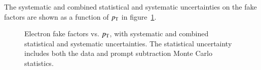 The systematic and combined statistical and systematic uncertainties on the fake factors are shown as a function of $p_{\text{T}}$ in figure~\ref{fig:electron-fake-factor-uncertainties}.

\begin{figure}[htbp] 
  \centering
  \caption{Electron fake factors vs. $p_{\text{T}}$, with systematic and combined statistical and systematic uncertainties. The statistical uncertainty includes both the data and prompt subtraction Monte Carlo statistics.}
  \label{fig:electron-fake-factor-uncertainties}
\end{figure}


